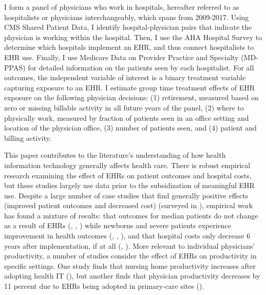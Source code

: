 \documentclass[12pt]{article}
\begin{document}
I form a panel of physicians who work in hospitals, hereafter referred to as hospitalists or physicians interchangeably, which spans from 2009-2017. Using CMS Shared Patient Data, I identify hospital-physician pairs that indicate the physician is working within the hospital. Then, I use the AHA Hospital Survey to determine which hospitals implement an EHR, and thus connect hospitalists to EHR use. Finally, I use Medicare Data on Provider Practice and Specialty (MD-PPAS) for detailed information on the patients seen by each hospitalist. For all outcomes, the independent variable of interest is a binary treatment variable capturing exposure to an EHR. I estimate group time treatment effects of EHR exposure on the following physician decisions: (1) retirement, measured based on zero or missing billable activity in all future years of the panel, (2) where to physically work, measured by fraction of patients seen in an office setting and location of the physician office, (3) number of patients seen, and (4) patient and billing activity. 

This paper contributes to the literature's understanding of how health information technology generally affects health care. There is robust empirical research examining the effect of EHRs on patient outcomes and hospital costs, but these studies largely use data prior to the subsidization of meaningful EHR use. Despite a large number of case studies that find generally positive effects (improved patient outcomes and decreased cost) (surveyed in \cite{Buntin2011TheResults}), empirical work has found a mixture of results: that outcomes for median patients do not change as a result of EHRs (\cite{Agha2014TheCare}, \cite{McCullough2016HealthCoordination}, \cite{Meyerhoefer}) while newborns and severe patients experience improvement in health outcomes (\cite{Miller2009}, \cite{Freedman2015}, \cite{McCullough2016HealthCoordination}), and that hospital costs only decrease 6 years after implementation, if at all (\cite{Agha2014TheCare}, \cite{dranove2014trillion}). More relevant to individual physicians' productivity, a number of studies consider the effect of EHRs on productivity in specific settings. One study finds that nursing home productivity increases after adopting health IT (\cite{Hitt2016}), but another finds that physician productivity decreases by 11 percent due to EHRs being adopted in primary-care sites (\cite{Meyerhoefer}).  
\end{document}
